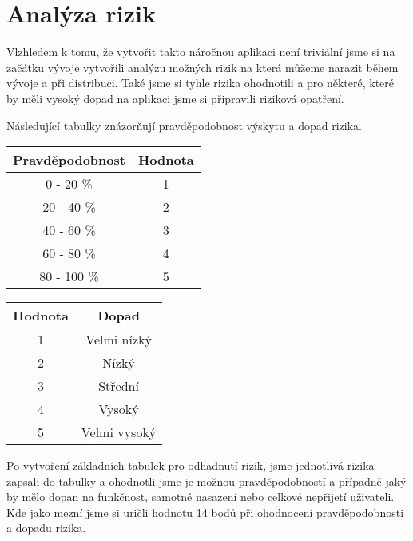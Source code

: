 \section{Analýza rizik}
\par Vlzhledem k tomu, že vytvořit takto náročnou aplikaci není triviální jsme si na začátku vývoje vytvořili analýzu možných rizik na která můžeme narazit během vývoje a při distribuci. Také jsme si tyhle rizika ohodnotili a pro některé, které by měli vysoký dopad na aplikaci jsme si připravili riziková opatření.

\par Následující tabulky znázorňují pravděpodobnost výskytu a dopad rizika.

\begin{tabular}{|c | c |}
\hline
Pravděpodobnost&Hodnota\\
\hline
0 - 20 \%&1\\
\hline
20 - 40 \%&2\\
\hline
40 - 60 \%&3\\
\hline
60 - 80 \%&4\\
\hline
80 - 100 \%&5\\
\hline
\end{tabular}
\qquad\qquad\qquad\qquad
\begin{tabular}{|c | c |}
\hline
Hodnota&Dopad\\
\hline
1&Velmi nízký\\
\hline
2&Nízký\\
\hline
3&Střední\\
\hline
4&Vysoký\\
\hline
5&Velmi vysoký\\
\hline
\end{tabular}

\par Po vytvoření základních tabulek pro odhadnutí rizik, jsme jednotlivá rizika zapsali do tabulky a ohodnotli jsme je možnou pravděpodobností a případně jaký by mělo dopan na funkčnost, samotné nasazení nebo celkové nepřijetí uživateli. Kde jako mezní jsme si uričli hodnotu 14 bodů při ohodnocení pravděpodobnosti a dopadu rizika.

